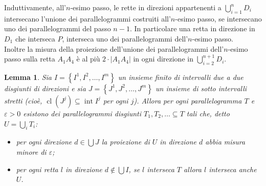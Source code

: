 \documentclass[a4paper, twoside,openright]{article}
\newcommand{\<}{\langle}
\renewcommand{\>}{\rangle}
\newtheorem{lemma}[teo]{Lemma}
\begin{document}
Induttivamente, all'$n$-esimo passo, le rette in direzioni appartenenti a $\bigcup_{i=1}^n D_i$ intersecano l'unione dei parallelogrammi costruiti all'$n$-esimo passo, se intersecano uno dei parallelogrammi del passo $n-1$. In particolare una retta in direzione in $D_1$ che interseca $P$, interseca uno dei parallelogrammi dell'$n$-esimo passo.\\
Inoltre la misura della proiezione dell'unione dei parallelogrammi dell'$n$-esimo passo sulla retta $A_{1} A_{4}$ è al più $2 \cdot\left|A_{1} A_{4}\right|$ in ogni direzione in $\bigcup_{i=2}^{n+1}D_i$.\\

\begin{lemma} \label{altroarticolo}
	Sia $I=\left\{I^{1}, I^{2}, \ldots, I^{m}\right\}$ un insieme finito di intervalli due a due disgiunti di direzioni e sia $J=\left\{J^{1}, J^{2}, \ldots, J^{m}\right\}$ un insieme di sotto intervalli stretti (cioè, $\operatorname{cl}\left(J^{j}\right) \subseteq \operatorname{int} I^{j}$ per ogni $j$). Allora per ogni parallelogramma $T$ e $\varepsilon>0$ esistono dei parallelogrammi disgiunti $T_{1}, T_{2}, \ldots \subseteq T$ tali che, detto $U=\bigcup_iT_i$:
	
	\begin{itemize}
		\item per ogni direzione $d \in \bigcup J$ la proiezione di $U$ in direzione $d$ abbia misura minore di $\varepsilon$;
		\item per ogni retta $l$ in direzione $d \notin \bigcup I$, se $l$ interseca $T$ allora $l$ interseca anche $U$.	
	\end{itemize}
\end{lemma}	
\end{document}
